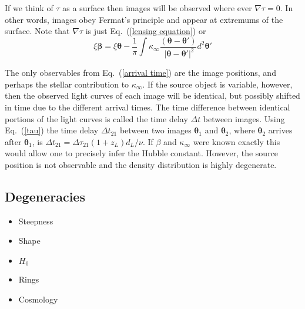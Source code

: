 \documentclass[onecolumn,galley]{mn2e}
\newcommand{\eqnref}[1] {Eq.~(\ref{#1})}
\renewcommand{\vec}[1]{\ensuremath{\boldsymbol{#1}}}
\begin{document}
If we think of $\tau$ as a surface then images will be observed where ever
$\nabla \tau = 0$. In other words, images obey Fermat's principle and appear at
extremums of the surface. Note that $\nabla \tau$ is just \eqnref{lensing equation} or
\begin{equation}
  \xi \vec\beta = \xi \vec\theta - \frac 1\pi\int \kappa_\infty\frac{(\vec\theta - \vec\theta')}{\ |\vec\theta - \vec\theta'|^2}d^2\vec\theta'
\end{equation}

The only observables from \eqnref{arrival time} are the image positions, and
perhaps the stellar contribution to $\kappa_\infty$.  If the source object is
variable, however, then the observed light curves of each image will be
identical, but possibly shifted in time due to the different arrival times.
The time difference between identical portions of the light curves is called
the time delay $\Delta t$ between images.  Using \eqnref{tau} the time delay
$\Delta t_{21}$ between two images $\vec\theta_1$ and $\vec\theta_2$, where $\vec\theta_2$
arrives after $\vec\theta_1$, is $\Delta t_{21} = \Delta \tau_{21}(1+z_L)d_L /
\nu$. If $\beta$ and $\kappa_\infty$ were known exactly this would allow one
to precisely infer the Hubble constant. However, the source position is not
observable and the density distribution is highly degenerate.

\subsection{Degeneracies} %

\begin{itemize}
  \item Steepness
  \item Shape
  \item $H_0$
  \item Rings
  \item Cosmology
\end{itemize}

%
%
%
\end{document}
